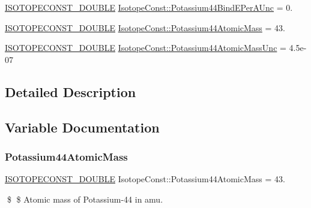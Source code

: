 \begin{DoxyCompactItemize}
\mbox{\hyperlink{group___isotope_const-_macros_ga8f45a7272ce02c0b4c65c44636ed719a}{I\+S\+O\+T\+O\+P\+E\+C\+O\+N\+S\+T\+\_\+\+D\+O\+U\+B\+LE}} \mbox{\hyperlink{group___isotope_const-_potassium-_k44_ga104ca072cc5fda037572dcd24ad0b3a4}{Isotope\+Const\+::\+Potassium44\+Bind\+E\+Per\+A\+Unc}} = 0.
\item 
\mbox{\hyperlink{group___isotope_const-_macros_ga8f45a7272ce02c0b4c65c44636ed719a}{I\+S\+O\+T\+O\+P\+E\+C\+O\+N\+S\+T\+\_\+\+D\+O\+U\+B\+LE}} \mbox{\hyperlink{group___isotope_const-_potassium-_k44_ga96bcaee2053c1de187956f7c647a9a57}{Isotope\+Const\+::\+Potassium44\+Atomic\+Mass}} = 43.
\item 
\mbox{\hyperlink{group___isotope_const-_macros_ga8f45a7272ce02c0b4c65c44636ed719a}{I\+S\+O\+T\+O\+P\+E\+C\+O\+N\+S\+T\+\_\+\+D\+O\+U\+B\+LE}} \mbox{\hyperlink{group___isotope_const-_potassium-_k44_gae68410cfa12add45206ea8ccccb365e3}{Isotope\+Const\+::\+Potassium44\+Atomic\+Mass\+Unc}} = 4.\+5e-\/07
\end{DoxyCompactItemize}


\subsection{Detailed Description}


\subsection{Variable Documentation}
\mbox{\label{group___isotope_const-_potassium-_k44_ga96bcaee2053c1de187956f7c647a9a57}} 
\subsubsection{\texorpdfstring{Potassium44\+Atomic\+Mass}{Potassium44AtomicMass}}
{\footnotesize\ttfamily \mbox{\hyperlink{group___isotope_const-_macros_ga8f45a7272ce02c0b4c65c44636ed719a}{I\+S\+O\+T\+O\+P\+E\+C\+O\+N\+S\+T\+\_\+\+D\+O\+U\+B\+LE}} Isotope\+Const\+::\+Potassium44\+Atomic\+Mass = 43.}

\$ \$ Atomic mass of Potassium-\/44 in amu. \mbox{\label{group___isotope_const-_potassium-_k44_gae68410cfa12add45206ea8ccccb365e3}} 
